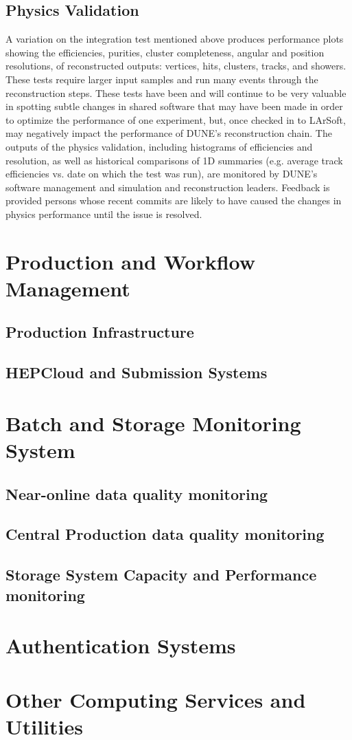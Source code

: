 \subsection{Physics Validation}

A variation on the integration test mentioned above produces performance plots showing the efficiencies, purities,
cluster completeness, angular and position resolutions, of reconstructed outputs:  vertices, hits, clusters, tracks,
and showers.  These tests require larger input samples and run many events through the reconstruction steps.
These tests have been and will continue to be very valuable in spotting subtle changes in shared software that
may have been made in order to optimize the performance of one experiment, but, once checked in to LArSoft,
may negatively impact the performance of DUNE's reconstruction chain.  The outputs of the physics validation,
including histograms of efficiencies and resolution, as well as historical comparisons of 1D summaries
(e.g. average track efficiencies vs. date on which the test was run), are monitored by DUNE's software management
and simulation and reconstruction leaders.  Feedback is provided persons whose recent commits are likely to
have caused the changes in physics performance until the issue is resolved.

\section{Production and Workflow Management} %
\subsection{Production Infrastructure}
\subsection{HEPCloud and Submission Systems}
\section{Batch and Storage Monitoring System} %
\subsection{Near-online data quality monitoring}
\subsection{Central Production data quality monitoring}
\subsection{Storage System Capacity and Performance monitoring}
\section{Authentication Systems}
\section{Other Computing Services and Utilities}
